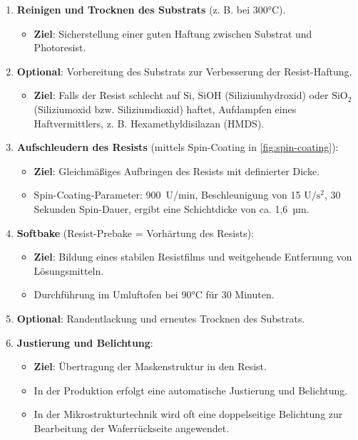 \documentclass{article} %
\begin{document}
\begin{enumerate}
    \item \textbf{Reinigen und Trocknen des Substrats} (z. B. bei 300°C).
    \begin{itemize}
        \item \textbf{Ziel}: Sicherstellung einer guten Haftung zwischen Substrat und Photoresist.
    \end{itemize}

    \item \textbf{Optional}: Vorbereitung des Substrats zur Verbesserung der Resist-Haftung.
    \begin{itemize}
        \item \textbf{Ziel}: Falls der Resist schlecht auf $\mathrm{Si}$, $\mathrm{SiOH}$ (Siliziumhydroxid) oder $\mathrm{SiO}_2$ (Siliziumoxid bzw. Siliziumdioxid) haftet, Aufdampfen eines Haftvermittlers, z. B. Hexamethyldisilazan (HMDS).
    \end{itemize}

    \item \textbf{Aufschleudern des Resists} (mittels Spin-Coating in \autoref{fig:spin-coating}):
    \begin{itemize}
        \item \textbf{Ziel}: Gleichmäßiges Aufbringen des Resists mit definierter Dicke.
        \item Spin-Coating-Parameter: 900~U/min, Beschleunigung von 15 $\mathrm{U}/\mathrm{s}^2$, 30 Sekunden Spin-Dauer, ergibt eine Schichtdicke von ca. 1,6~µm.
    \end{itemize}

    \item \textbf{Softbake} (Resist-Prebake = Vorhärtung des Resists):
    \begin{itemize}
        \item \textbf{Ziel}: Bildung eines stabilen Resistfilms und weitgehende Entfernung von Lösungsmitteln.
        \item Durchführung im Umluftofen bei 90°C für 30 Minuten.
    \end{itemize}

    \item \textbf{Optional}: Randentlackung und erneutes Trocknen des Substrats.

    \item \textbf{Justierung und Belichtung}:
    \begin{itemize}
        \item \textbf{Ziel}: Übertragung der Maskenstruktur in den Resist.
        \item In der Produktion erfolgt eine automatische Justierung und Belichtung.
        \item In der Mikrostrukturtechnik wird oft eine doppelseitige Belichtung zur Bearbeitung der Waferrückseite angewendet.
    \end{itemize}


\end{enumerate}
\end{document}
